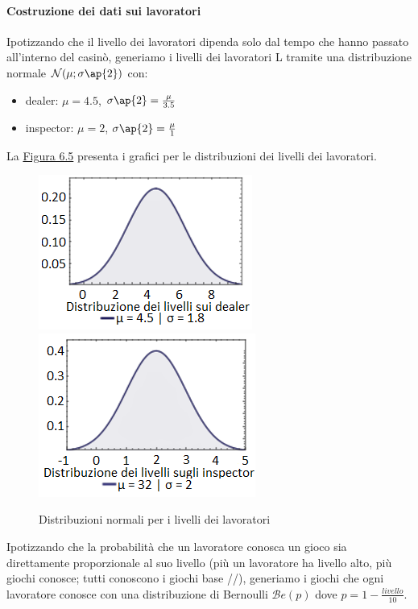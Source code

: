    \paragraph{Costruzione dei dati sui lavoratori} Ipotizzando che il livello dei lavoratori dipenda solo dal tempo che hanno passato all'interno del casinò, generiamo i livelli dei lavoratori L tramite una distribuzione normale $\mathcal{N}(\mu;\sigma \ap{2})$ con:
    \begin{itemize}
        \item dealer: $\mu = 4.5$, $\sigma \ap{2} = \frac{\mu}{3.5}$
        \item inspector: $\mu = 2$, $\sigma \ap{2} = \frac{\mu}{1}$
    \end{itemize}
\noindent
La \hyperref[fig65]{Figura 6.5} presenta i grafici per le distribuzioni dei livelli dei lavoratori.
     \begin{figure}[!htb]
         \label{fig65}
         \begin{widepage}
             \centering
             \includegraphics[width=.49\textwidth]{../immagini/livelli_dealer.png}\hfil
             \includegraphics[width=.49\textwidth]{../immagini/livelli_insp.png}
             \caption{Distribuzioni normali per i livelli dei lavoratori}
         \end{widepage}
     \end{figure}
     \FloatBarrier
     \noindent
     Ipotizzando che la probabilità che un lavoratore conosca un gioco sia direttamente proporzionale al suo livello (più un lavoratore ha livello alto, più giochi conosce; tutti conoscono i giochi base //), generiamo i giochi che ogni lavoratore conosce con una distribuzione di Bernoulli $\mathcal{B}e(p)$ dove $p = 1 - \frac{livello}{10}$.\\
